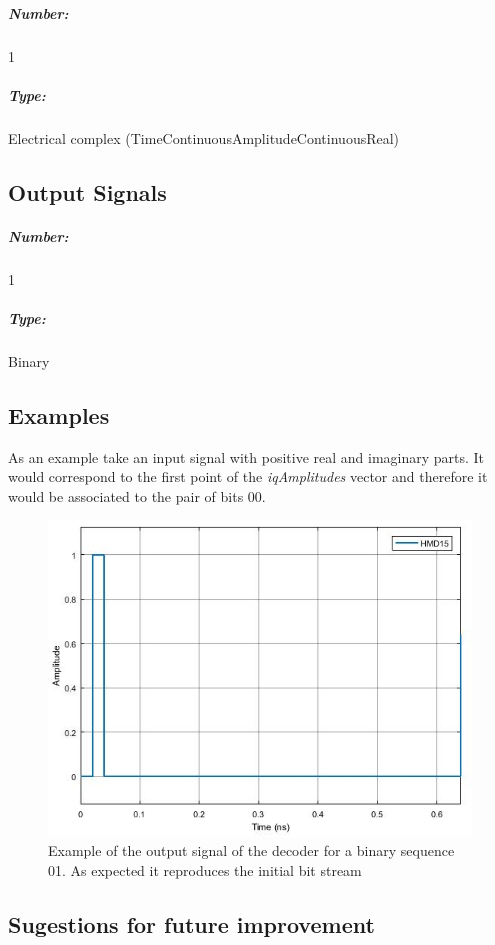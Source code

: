\documentclass[a4paper]{article}
\begin{document}
\subparagraph*{Number:} 1

\subparagraph*{Type:} Electrical complex (TimeContinuousAmplitudeContinuousReal)

\subsection*{Output Signals}

\subparagraph*{Number:} 1

\subparagraph*{Type:} Binary 

\subsection*{Examples}

As an example take an input signal with positive real and imaginary parts. It would correspond to the first point of the \textit{iqAmplitudes} vector and therefore it would be associated to the  pair of bits $00$. 

\begin{figure}[h]
	\centering
	\includegraphics[width=\textwidth]{Decoder_output}
	\caption{Example of the output signal of the decoder for a binary sequence 01. As expected it reproduces the initial bit stream}\label{Decoder_output}
\end{figure}

\subsection*{Sugestions for future improvement}
\end{document}
